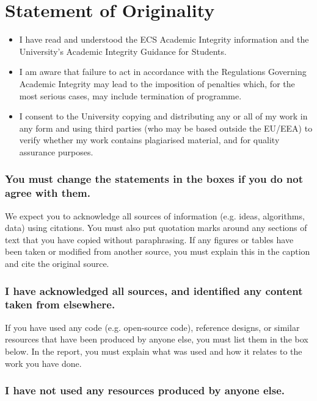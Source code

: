\section*{Statement of Originality}
\begin{itemize}
    \item I have read and understood the ECS Academic Integrity information and the University’s Academic Integrity Guidance for Students.
    \item I am aware that failure to act in accordance with the Regulations Governing Academic Integrity may lead to the imposition of penalties which, for the most serious cases, may include termination of programme.
    \item I consent to the University copying and distributing any or all of my work in any form and using third parties (who may be based outside the EU/EEA) to verify whether my work contains plagiarised material, and for quality assurance purposes.
\end{itemize}
\subsubsection*{You must change the statements in the boxes if you do not agree with them.}

We expect you to acknowledge all sources of information (e.g. ideas, algorithms, data) using citations. You must also put quotation marks around any sections of text that you have copied without paraphrasing. If any figures or tables have been taken or modified from another source, you must explain this in the caption and cite the original source. 

\subsubsection*{I have acknowledged all sources, and identified any content taken from elsewhere.}

If you have used any code (e.g. open-source code), reference designs, or similar resources that have been produced by anyone else, you must list them in the box below. In the report, you must explain what was used and how it relates to the work you have done.

\subsubsection*{I have not used any resources produced by anyone else.}

